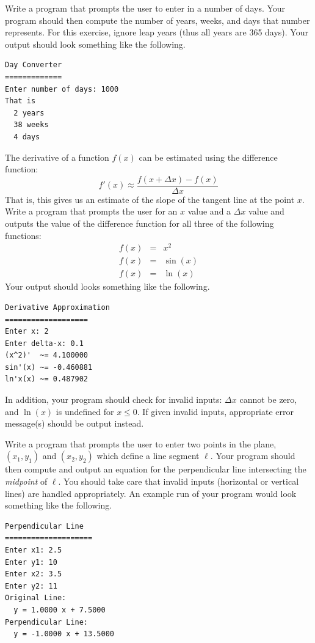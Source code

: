 \begin{exer}
Write a program that prompts the user to enter in a number of days.  Your program should
then compute the number of years, weeks, and days that number represents.  For this 
exercise, ignore leap years (thus all years are 365 days). Your output should look something 
like the following.

\begin{verbatim}
Day Converter
=============
Enter number of days: 1000
That is 
  2 years
  38 weeks
  4 days
\end{verbatim}
\end{exer}

\begin{exer}
The derivative of a function $f(x)$ can be estimated using the difference function:
  $$f'(x) \approx \frac{f(x+\Delta x) - f(x)}{\Delta x}$$
That is, this gives us an estimate of the slope of the tangent line at the point $x$.  
Write a program that prompts the user for an $x$ value and a $\Delta x$ value and 
outputs the value of the difference function for all three of the following functions:
  $$\begin{array}{rcl}
  	f(x) & = & x^2 \\
	f(x) & = & \sin(x) \\
	f(x) & = & \ln(x)
    \end{array}$$
Your output should looks something like the following.

\begin{verbatim}
Derivative Approximation
===================
Enter x: 2
Enter delta-x: 0.1
(x^2)'  ~= 4.100000
sin'(x) ~= -0.460881
ln'x(x) ~= 0.487902
\end{verbatim}

In addition, your program should check for invalid inputs: $\Delta x$ cannot be zero, and $\ln(x)$ is undefined
for $x \leq 0$.  If given invalid inputs, appropriate error message(s) should be output instead.
\end{exer}

\begin{exer}
Write a program that prompts the user to enter two points in the plane, $(x_1, y_1)$ 
and $(x_2, y_2)$ which define a line segment $\ell$.  Your program should then compute 
and output an equation for the perpendicular line intersecting the \emph{midpoint} of $\ell$.  
You should take care that invalid inputs (horizontal or vertical lines) are handled appropriately.
An example run of your program would look something like the following.

\begin{verbatim}
Perpendicular Line
====================
Enter x1: 2.5
Enter y1: 10
Enter x2: 3.5
Enter y2: 11
Original Line: 
  y = 1.0000 x + 7.5000
Perpendicular Line: 
  y = -1.0000 x + 13.5000
\end{verbatim}
\end{exer}

